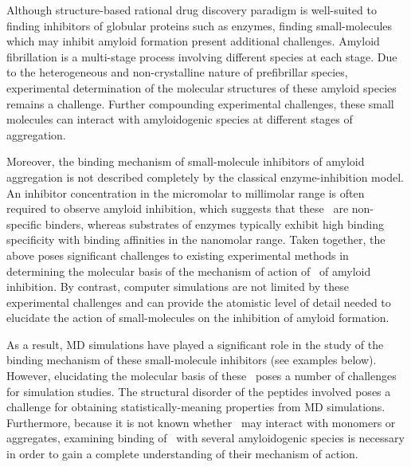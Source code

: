 Although structure-based rational drug discovery paradigm is well-suited to finding inhibitors of globular proteins such as enzymes, finding small-molecules which may inhibit amyloid formation present additional challenges. Amyloid fibrillation is a multi-stage process involving different species at each stage.  Due to the heterogeneous and non-crystalline nature of prefibrillar species, experimental determination of the molecular structures of these amyloid species remains a challenge.  Further compounding experimental challenges, these small molecules can interact with amyloidogenic species at different stages of aggregation. 

Moreover, the binding mechanism of small-molecule inhibitors of amyloid aggregation is not described completely by the classical enzyme-inhibition model.   An inhibitor concentration in the micromolar to millimolar range is often required to observe amyloid inhibition, which suggests that these \smis\ are non-specific binders, whereas substrates of enzymes typically exhibit high binding specificity with binding affinities in the nanomolar range.  Taken together, the above poses significant challenges to existing experimental methods in determining the molecular basis of the mechanism of action of \smis\ of amyloid inhibition.  By contrast, computer simulations are not limited by these experimental challenges and can provide the atomistic level of detail needed to elucidate the action of small-molecules on the inhibition of amyloid formation.

As a result, MD simulations have played a significant role in the study of the binding mechanism of these small-molecule inhibitors (see examples below). However, elucidating the molecular basis of these \smis\ poses a number of challenges for simulation studies. The structural disorder of the peptides involved poses a challenge for obtaining statistically-meaning properties from MD simulations.  Furthermore, because it is not known whether \smis\ may interact with monomers or aggregates, examining binding of \smi\ with several amyloidogenic species is necessary in order to gain a complete understanding of their mechanism of action.

